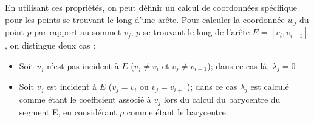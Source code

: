 En utilisant ces propriétés, on peut définir un calcul de coordonnées spécifique
pour les points se trouvant le long d'une arête. Pour calculer la coordonnée
$w_j$ du point $p$ par rapport au sommet $v_j$, $p$ se trouvant le long de
l'arête $E = [v_i,v_{i+1}]$, on distingue deux cas :

\begin{itemize}
\item Soit $v_j$ n'est pas incident à $E$ ($v_j \neq v_i$ et $v_j \neq
v_{i+1}$); dans ce cas là, $\lambda_j = 0$
\item Soit $v_j$ est incident à $E$ ($v_j = v_i$ ou $v_j = v_{i+1}$); dans ce
cas $\lambda_j$ est calculé comme étant le coefficient associé à $v_j$ lors du calcul
du barycentre du segment E, en considérant $p$ comme étant le barycentre.
\end{itemize}